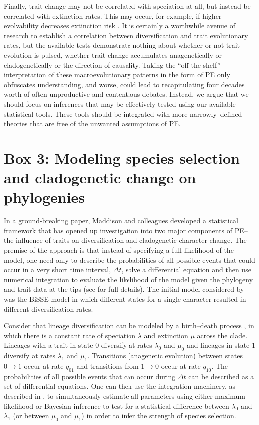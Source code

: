 Finally, trait change may not be correlated with speciation at all, but instead be correlated with extinction rates.  This may occur, for example, if higher evolvability decreases extinction risk \citep{Lanfear2010}. It is certainly a worthwhile avenue of research to establish a correlation between diversification and trait evolutionary rates, but the available tests demonstrate nothing about whether or not trait evolution is pulsed, whether trait change accumulates anagenetically or cladogenetically or the direction of causality. Taking the ``off-the-shelf'' interpretation of these macroevolutionary patterns in the form of PE only obfuscates understanding, and worse, could lead to recapitulating four decades worth of often unproductive and contentious debates. Instead, we argue that we should focus on inferences that may be effectively tested using our available statistical tools. These tools should be integrated with more narrowly--defined theories that are free of the unwanted assumptions of PE.  

\section{Box 3: Modeling species selection and cladogenetic change on phylogenies}

In a ground-breaking paper, Maddison and colleagues \citep{Maddison2007} developed a statistical framework that has opened up investigation into two major components of PE--the influence of traits on diversification \citep[``species selection'', \textit{sensu}][]{CoyneOrr, RaboskyMcCune2010} and cladogenetic character change. The premise of the approach is that instead of specifying a full likelihood of the model, one need only to describe the probabilities of all possible events that could occur in a very short time interval, $\Delta t$, solve a differential equation and then use numerical integration to evaluate the likelihood of the model given the phylogeny and trait data at the tips (see \citep{Maddison2007} for full details). The initial model considered by \citet{Maddison2007} was the BiSSE model in which different states for a single character resulted in different diversification rates.

Consider that lineage diversification can be modeled by a birth--death process \citep{Kendall1948}, in which there is a constant rate of speciation $\lambda$ and extinction $\mu$ across the clade. Lineages with a trait in state $0$ diversify at rates $\lambda_0$ and $\mu_0$ and lineages in state $1$ diversify at rates $\lambda_1$ and $\mu_1$. Transitions (anagenetic evolution) between states $0 \rightarrow 1$ occur at rate $q_{01}$ and transitions from $1 \rightarrow 0$ occur at rate $q_{10}$. The probabilities of all possible events that can occur during $\Delta t$ can be described as a set of differential equations. One can then use the integration machinery, as described in \citet{Maddison2007}, to simultaneously estimate all parameters using either maximum likelihood or Bayesian inference to test for a statistical difference between $\lambda_{0}$ and $\lambda_{1}$ (or between $\mu_0$ and $\mu_1$) in order to infer the strength of species selection.

